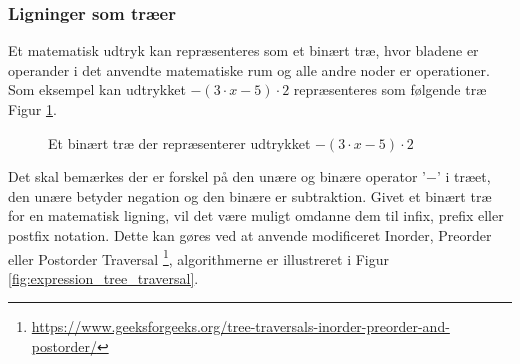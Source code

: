\documentclass{article}
\begin{document}
 

\subsubsection{Ligninger som træer}
Et matematisk udtryk kan repræsenteres som et binært træ, hvor bladene er operander i det anvendte matematiske rum og alle andre noder er operationer. Som eksempel kan udtrykket $-(3 \cdot x - 5) \cdot 2$ repræsenteres som følgende træ Figur \ref{fig:expression_tree}. 


\begin{figure}[H]
\centering
{}
\caption{Et binært træ der repræsenterer udtrykket $-(3 \cdot x - 5) \cdot 2$}
\label{fig:expression_tree}
\end{figure}
Det skal bemærkes der er forskel på den unære og binære operator '$-$' i træet, den unære betyder negation og den binære er subtraktion. Givet et binært træ for en matematisk ligning, vil det være muligt omdanne dem til infix, prefix eller postfix notation. Dette kan gøres ved at anvende modificeret Inorder, Preorder eller Postorder Traversal \footnote{\url{https://www.geeksforgeeks.org/tree-traversals-inorder-preorder-and-postorder/}}, algorithmerne er illustreret i Figur \ref{fig:expression_tree_traversal}.
\end{document}
